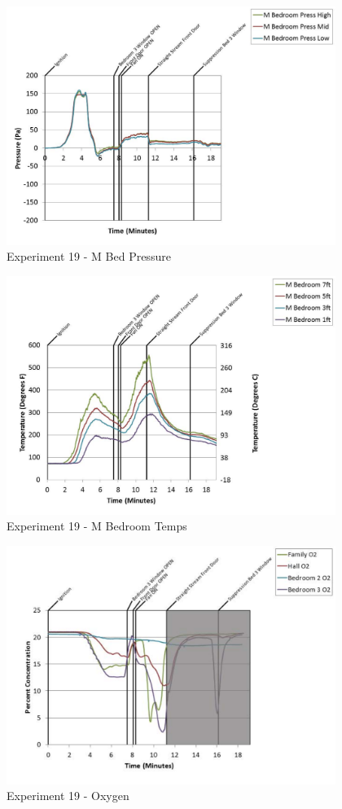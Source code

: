 \documentclass{article}
\begin{document}
\begin{appendices}
	\clearpage

	\begin{figure}[h!]
		\centering
		\includegraphics[height=3.05in]{0_Images/Results_Charts/Exp_19_Charts/MBedPressure.pdf}
		\caption{Experiment 19 - M Bed Pressure}
	\end{figure}
 

	\begin{figure}[h!]
		\centering
		\includegraphics[height=3.05in]{0_Images/Results_Charts/Exp_19_Charts/MBedroomTemps.pdf}
		\caption{Experiment 19 - M Bedroom Temps}
	\end{figure}
 
	\clearpage

	\begin{figure}[h!]
		\centering
		\includegraphics[height=3.05in]{0_Images/Results_Charts/Exp_19_Charts/Oxygen.pdf}
		\caption{Experiment 19 - Oxygen}
	\end{figure}
 


\end{appendices}
\end{document}
